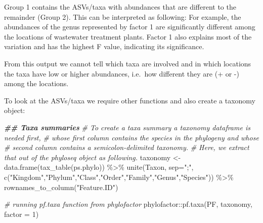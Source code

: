 \documentclass[
]{book}
\newenvironment{Shaded}{\begin{snugshade}}{\end{snugshade}}
\newcommand{\AttributeTok}[1]{\textcolor[rgb]{0.77,0.63,0.00}{#1}}
\newcommand{\CommentTok}[1]{\textcolor[rgb]{0.56,0.35,0.01}{\textit{#1}}}
\newcommand{\DecValTok}[1]{\textcolor[rgb]{0.00,0.00,0.81}{#1}}
\newcommand{\DocumentationTok}[1]{\textcolor[rgb]{0.56,0.35,0.01}{\textbf{\textit{#1}}}}
\newcommand{\FunctionTok}[1]{\textcolor[rgb]{0.00,0.00,0.00}{#1}}
\newcommand{\NormalTok}[1]{#1}
\newcommand{\OtherTok}[1]{\textcolor[rgb]{0.56,0.35,0.01}{#1}}
\newcommand{\SpecialCharTok}[1]{\textcolor[rgb]{0.00,0.00,0.00}{#1}}
\newcommand{\StringTok}[1]{\textcolor[rgb]{0.31,0.60,0.02}{#1}}
\begin{document}
Group 1 contains the ASVs/taxa with abundances that are different to the remainder (Group 2). This can be interpreted as following: For example, the abundances of the genus represented by factor 1 are significantly different among the locations of wastewater treatment plants. Factor 1 also explains most of the variation and has the highest F value, indicating its significance.

From this output we cannot tell which taxa are involved and in which locations the taxa have low or higher abundances, i.e.~how different they are (+ or -) among the locations.

To look at the ASVs/taxa we require other functions and also create a taxonomy object:

\begin{Shaded}
\begin{Highlighting}[]
\DocumentationTok{\#\# Taxa summaries}
\CommentTok{\# To create a taxa summary a taxonomy dataframe is needed first, }
\CommentTok{\# whose first column contains the species in the phylogeny and whose}
\CommentTok{\# second column contains a semicolon{-}delimited taxonomy. }
\CommentTok{\# Here, we extract that out of the phyloseq object as following.}
\NormalTok{taxonomy }\OtherTok{\textless{}{-}} \FunctionTok{data.frame}\NormalTok{(}\FunctionTok{tax\_table}\NormalTok{(ps.phylo)) }\SpecialCharTok{\%\textgreater{}\%}
  \FunctionTok{unite}\NormalTok{(Taxon, }\AttributeTok{sep=}\StringTok{";"}\NormalTok{, }\FunctionTok{c}\NormalTok{(}\StringTok{"Kingdom"}\NormalTok{,}\StringTok{"Phylum"}\NormalTok{,}\StringTok{"Class"}\NormalTok{,}\StringTok{"Order"}\NormalTok{,}\StringTok{"Family"}\NormalTok{,}\StringTok{"Genus"}\NormalTok{,}\StringTok{"Species"}\NormalTok{))  }\SpecialCharTok{\%\textgreater{}\%}
  \FunctionTok{rownames\_to\_column}\NormalTok{(}\StringTok{"Feature.ID"}\NormalTok{)  }
 
\CommentTok{\# running pf.taxa function from phylofactor}
\NormalTok{phylofactor}\SpecialCharTok{::}\FunctionTok{pf.taxa}\NormalTok{(PF, taxonomy, }\AttributeTok{factor =} \DecValTok{1}\NormalTok{)}
\end{Highlighting}
\end{Shaded}
\end{document}

